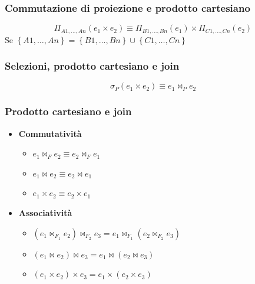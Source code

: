 \documentclass[12pt, a4paper]{report}
\begin{document}
    \subsubsection{Commutazione di proiezione e prodotto cartesiano}
    \begin{equation*}
        \Pi_{A1,\ldots,An}(e_{1}\times e_{2})\equiv \Pi_{B1,\ldots,Bn}(e_{1}) \times \Pi_{C1,\ldots,Cn}(e_{2})
    \end{equation*}
    Se $\left\{A1,\ldots,An\right\} = \left\{B1,\ldots,Bn\right\} \cup \left\{C1,\ldots,Cn\right\}$
    \subsubsection{Selezioni, prodotto cartesiano e join}
    \begin{equation*}
        \sigma_{P}(e_{1} \times e_{2}) \equiv e_{1}\Join_{P}  e_{2}
    \end{equation*}
    \subsubsection{Prodotto cartesiano e join}
    \begin{itemize}
        \item \textbf{Commutatività} \begin{itemize}
            \item $e_{1} \Join_{F} e_{2} \equiv e_{2} \Join_{F} e_{1}$
            \item $e_{1} \Join e_{2} \equiv e_{2} \Join e_{1}$
            \item $e_{1} \times e_{2} \equiv e_{2} \times e_{1}$
        \end{itemize}
        \item \textbf{Associatività} \begin{itemize}
            \item $(e_{1} \Join_{F_{1}} e_{2})\Join_{F_{2}} e_{3} = e_{1} \Join_{F_{1}} (e_{2} \Join_{F_{2}} e_{3})$
            \item $(e_{1} \Join e_{2})\Join e_{3} = e_{1} \Join(e_{2} \Join e_{3})$
            \item $(e_{1} \times e_{2})\times e_{3} = e_{1} \times (e_{2} \times e_{3})$
        \end{itemize}
    \end{itemize}
\end{document}
